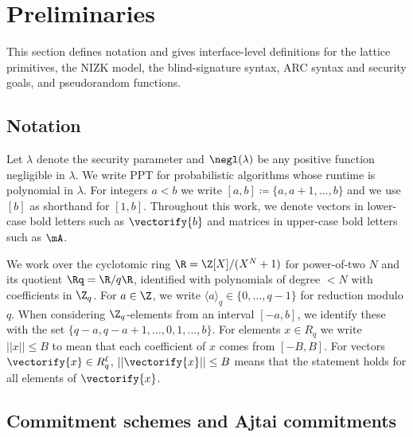 \section{Preliminaries}
\label{sec:preliminaries}

This section defines notation and gives interface-level definitions for the lattice primitives, the NIZK model, the
blind-signature syntax, ARC syntax and security goals, and pseudorandom functions.



\subsection{Notation}
Let $\lambda$ denote the security parameter and  \(\negl(\lambda)\) be any positive function negligible in  \(\lambda\). We write PPT for
probabilistic algorithms whose runtime is polynomial in \(\lambda\). For integers \(a<b\) we write
\([a,b]\coloneqq\{a,a+1,\ldots,b\}\) and we use \([b]\) as shorthand for \([1,b]\). Throughout this work, we denote vectors in lower-case bold letters such as $\vectorify{b}$ and matrices in upper-case bold letters such as $\mA$.

We work over the cyclotomic ring \(\R=\Z[X]/(X^N+1)\) for power-of-two \(N\) and its quotient \(\Rq=\R/q\R\), identified
with polynomials of degree \(<N\) with coefficients in \(\Z_q\). For \(a\in\Z\), we write \(\langle a\rangle_q\in\{0,\dots,q-1\}\)
for reduction modulo \(q\). When considering $\Z_q$-elements from an interval \([-a,b]\), we identify these with the set  $\{q-a,q-a+1,\dots,0,1,\dots,b\}$.
For elements $x\in R_q$ we write $||x||\leq B$ to mean that each coefficient of $x$ comes from $[-B,B]$. For vectors $\vectorify{x}\in R_q^\ell$, $||\vectorify{x}||\leq B$ means that the statement holds for all elements of $\vectorify{x}$.

\subsection{Commitment schemes and Ajtai commitments}
\label{subsec:prelim-commit}
\label{subsec:commitments}

